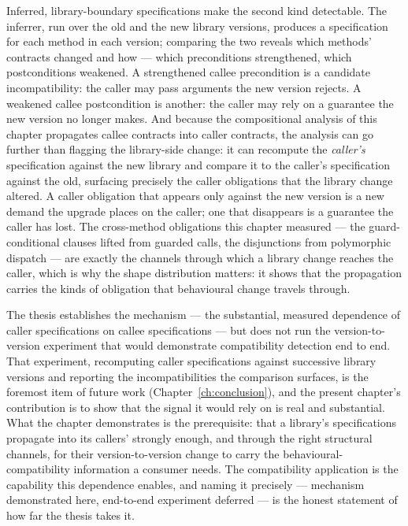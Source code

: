 Inferred, library-boundary specifications make the second kind detectable. The
inferrer, run over the old and the new library versions, produces a specification
for each method in each version; comparing the two reveals which methods' contracts
changed and how --- which preconditions strengthened, which postconditions weakened.
A strengthened callee precondition is a candidate incompatibility: the caller may
pass arguments the new version rejects. A weakened callee postcondition is another:
the caller may rely on a guarantee the new version no longer makes. And because the
compositional analysis of this chapter propagates callee contracts into caller
contracts, the analysis can go further than flagging the library-side change: it
can recompute the \emph{caller's} specification against the new library and compare
it to the caller's specification against the old, surfacing precisely the caller
obligations that the library change altered. A caller obligation that appears only
against the new version is a new demand the upgrade places on the caller; one that
disappears is a guarantee the caller has lost. The cross-method obligations this
chapter measured --- the guard-conditional clauses lifted from guarded calls, the
disjunctions from polymorphic dispatch --- are exactly the channels through which a
library change reaches the caller, which is why the shape distribution matters: it
shows that the propagation carries the kinds of obligation that behavioural change
travels through.

The thesis establishes the mechanism --- the substantial, measured dependence of
caller specifications on callee specifications --- but does not run the
version-to-version experiment that would demonstrate compatibility detection
end to end. That experiment, recomputing caller specifications against successive
library versions and reporting the incompatibilities the comparison surfaces, is
the foremost item of future work (Chapter~\ref{ch:conclusion}), and the present
chapter's contribution is to show that the signal it would rely on is real and
substantial. What the chapter demonstrates is the prerequisite: that a library's
specifications propagate into its callers' strongly enough, and through the right
structural channels, for their version-to-version change to carry the behavioural-
compatibility information a consumer needs. The compatibility application is the
capability this dependence enables, and naming it precisely --- mechanism
demonstrated here, end-to-end experiment deferred --- is the honest statement of
how far the thesis takes it.

